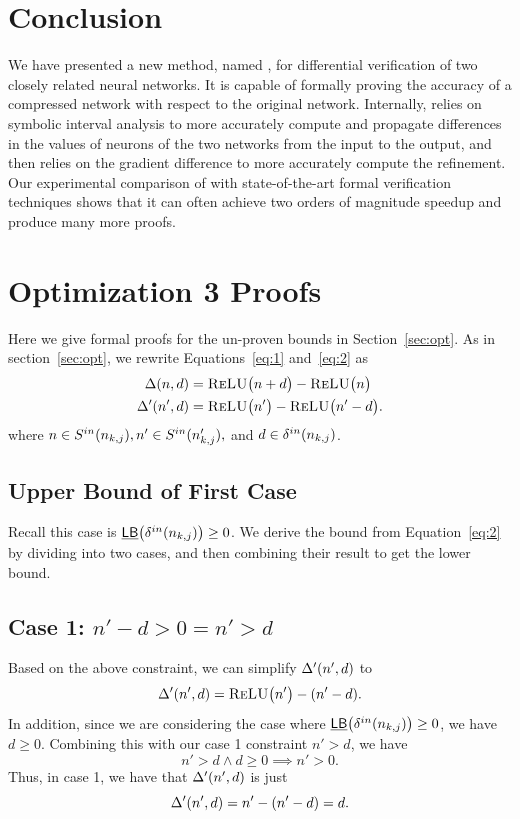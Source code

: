 \section{Conclusion}
\label{sec:conclusion}

We have presented a new method, named \diffNN{}, for differential
verification of two closely related neural networks.  It is capable of
formally proving the accuracy of a compressed network with respect to
the original network.  Internally, \diffNN{} relies on symbolic
interval analysis to more accurately compute and propagate differences
in the values of neurons of the two networks from the input to the
output, and then relies on the gradient difference to more accurately
compute the refinement.  Our experimental comparison of \diffNN{} with
state-of-the-art formal verification techniques shows that it can often
achieve two orders of magnitude speedup and produce many more proofs.


\section{Optimization 3 Proofs}
Here we give formal proofs for the un-proven bounds in Section~\ref{sec:opt}.
As in section~\ref{sec:opt}, we rewrite Equations~\ref{eq:1} and~\ref{eq:2} as
\begin{align*}
\Delta(n,d) & = \textsc{ReLU}\big(n + d\big) - \textsc{ReLU}\big(n\big)\\
\Delta'(n', d) & = \textsc{ReLU}\big(n'\big) - \textsc{ReLU}\big(n' - d\big).
\end{align*}
where $ n \in S^{in}(n_{k,j}), n' \in S^{in}(n'_{k,j}), $ and $ d \in \delta^{in}(n_{k,j}) $.

\subsection{Upper Bound of First Case}
Recall this case is $ \underline{\mathsf{LB}}\big(\delta^{in}(n_{k,j})\big) \geq 0 $.
We derive the bound from Equation~\ref{eq:2} by dividing into two cases, and then combining their result
to get the lower bound.

\subsection*{Case 1: $ n' - d > 0 = n' > d $}
Based on the above constraint, we can simplify $ \Delta'(n',d) $ to
\[
	\Delta'(n',d) = \textsc{ReLU}\big(n'\big) - (n' - d).
\]
In addition, since we are considering the case where $ \underline{\mathsf{LB}}\big(\delta^{in}(n_{k,j})\big) \geq 0 $,
we have $ d \geq 0 $. Combining this with our case 1 constraint $ n' > d $,
we have
\[
	n' > d \wedge d \geq 0 \implies n' > 0.
\]
Thus, in case 1, we have that $ \Delta'(n',d) $ is just
\[
	\Delta'(n',d) = n' - (n' - d) = d.
\]

